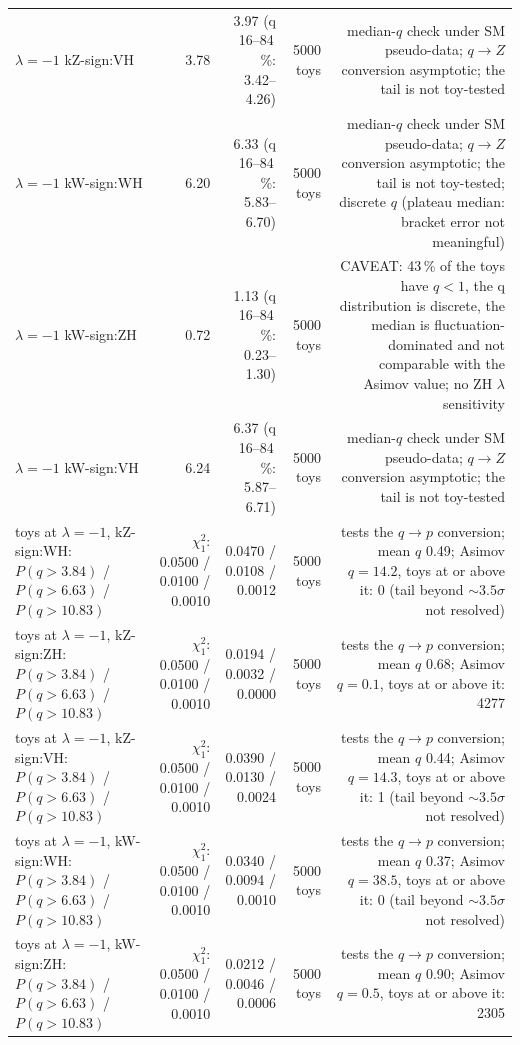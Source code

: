 \begin{table}[ht]
\begin{tabular}{lrrrr}
$\lambda{=}{-}1$ kZ-sign:VH & 3.78 & 3.97 (q 16--84\,\%: 3.42--4.26) & 5000 toys & median-$q$ check under SM pseudo-data; $q\to Z$ conversion asymptotic; the tail is not toy-tested \\
$\lambda{=}{-}1$ kW-sign:WH & 6.20 & 6.33 (q 16--84\,\%: 5.83--6.70) & 5000 toys & median-$q$ check under SM pseudo-data; $q\to Z$ conversion asymptotic; the tail is not toy-tested; discrete $q$ (plateau median: bracket error not meaningful) \\
$\lambda{=}{-}1$ kW-sign:ZH & 0.72 & 1.13 (q 16--84\,\%: 0.23--1.30) & 5000 toys & CAVEAT: 43\,\% of the toys have $q<1$, the q distribution is discrete, the median is fluctuation-dominated and not comparable with the Asimov value; no ZH $\lambda$ sensitivity \\
$\lambda{=}{-}1$ kW-sign:VH & 6.24 & 6.37 (q 16--84\,\%: 5.87--6.71) & 5000 toys & median-$q$ check under SM pseudo-data; $q\to Z$ conversion asymptotic; the tail is not toy-tested \\
toys at $\lambda{=}{-}1$, kZ-sign:WH: $P(q>3.84)$ / $P(q>6.63)$ / $P(q>10.83)$ & $\chi^2_1$: 0.0500 / 0.0100 / 0.0010 & 0.0470 / 0.0108 / 0.0012 & 5000 toys & tests the $q\to p$ conversion; mean $q$ 0.49; Asimov $q=14.2$, toys at or above it: 0 (tail beyond $\sim3.5\sigma$ not resolved) \\
toys at $\lambda{=}{-}1$, kZ-sign:ZH: $P(q>3.84)$ / $P(q>6.63)$ / $P(q>10.83)$ & $\chi^2_1$: 0.0500 / 0.0100 / 0.0010 & 0.0194 / 0.0032 / 0.0000 & 5000 toys & tests the $q\to p$ conversion; mean $q$ 0.68; Asimov $q=0.1$, toys at or above it: 4277 \\
toys at $\lambda{=}{-}1$, kZ-sign:VH: $P(q>3.84)$ / $P(q>6.63)$ / $P(q>10.83)$ & $\chi^2_1$: 0.0500 / 0.0100 / 0.0010 & 0.0390 / 0.0130 / 0.0024 & 5000 toys & tests the $q\to p$ conversion; mean $q$ 0.44; Asimov $q=14.3$, toys at or above it: 1 (tail beyond $\sim3.5\sigma$ not resolved) \\
toys at $\lambda{=}{-}1$, kW-sign:WH: $P(q>3.84)$ / $P(q>6.63)$ / $P(q>10.83)$ & $\chi^2_1$: 0.0500 / 0.0100 / 0.0010 & 0.0340 / 0.0094 / 0.0010 & 5000 toys & tests the $q\to p$ conversion; mean $q$ 0.37; Asimov $q=38.5$, toys at or above it: 0 (tail beyond $\sim3.5\sigma$ not resolved) \\
toys at $\lambda{=}{-}1$, kW-sign:ZH: $P(q>3.84)$ / $P(q>6.63)$ / $P(q>10.83)$ & $\chi^2_1$: 0.0500 / 0.0100 / 0.0010 & 0.0212 / 0.0046 / 0.0006 & 5000 toys & tests the $q\to p$ conversion; mean $q$ 0.90; Asimov $q=0.5$, toys at or above it: 2305 \\

\end{tabular}
\end{table}
